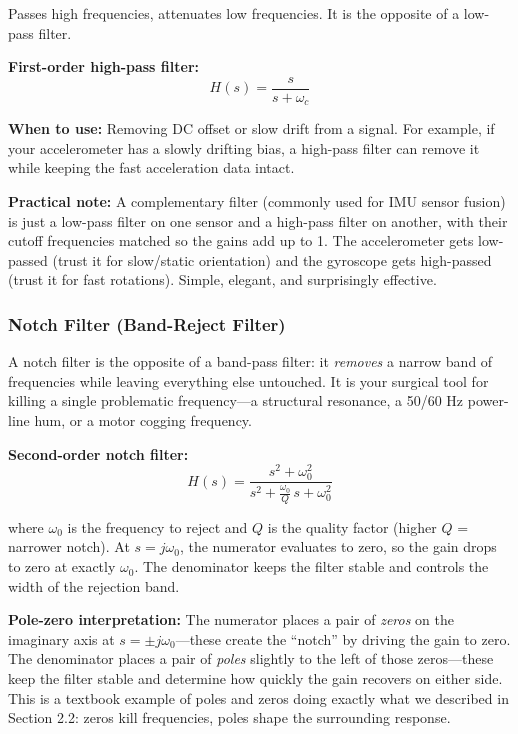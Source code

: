 Passes high frequencies, attenuates low frequencies. It is the opposite of a low-pass filter.

\textbf{First-order high-pass filter:}
\begin{equation}
H(s) = \frac{s}{s + \omega_c}
\end{equation}

\textbf{When to use:} Removing DC offset or slow drift from a signal. For example, if your accelerometer has a slowly drifting bias, a high-pass filter can remove it while keeping the fast acceleration data intact.

\textbf{Practical note:} A complementary filter (commonly used for IMU sensor fusion) is just a low-pass filter on one sensor and a high-pass filter on another, with their cutoff frequencies matched so the gains add up to 1. The accelerometer gets low-passed (trust it for slow/static orientation) and the gyroscope gets high-passed (trust it for fast rotations). Simple, elegant, and surprisingly effective.

\subsubsection{Notch Filter (Band-Reject Filter)}

A notch filter is the opposite of a band-pass filter: it \emph{removes} a narrow band of frequencies while leaving everything else untouched. It is your surgical tool for killing a single problematic frequency---a structural resonance, a 50/60 Hz power-line hum, or a motor cogging frequency.

\textbf{Second-order notch filter:}
\begin{equation}
H(s) = \frac{s^2 + \omega_0^2}{s^2 + \frac{\omega_0}{Q}\,s + \omega_0^2}
\end{equation}

where $\omega_0$ is the frequency to reject and $Q$ is the quality factor (higher $Q$ = narrower notch). At $s = j\omega_0$, the numerator evaluates to zero, so the gain drops to zero at exactly $\omega_0$. The denominator keeps the filter stable and controls the width of the rejection band.

\textbf{Pole-zero interpretation:} The numerator places a pair of \textit{zeros} on the imaginary axis at $s = \pm j\omega_0$---these create the ``notch'' by driving the gain to zero. The denominator places a pair of \textit{poles} slightly to the left of those zeros---these keep the filter stable and determine how quickly the gain recovers on either side. This is a textbook example of poles and zeros doing exactly what we described in Section 2.2: zeros kill frequencies, poles shape the surrounding response.

